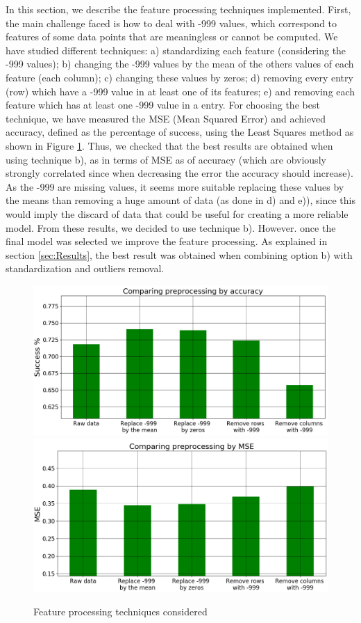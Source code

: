 \documentclass[10pt,conference,compsocconf]{IEEEtran}
\begin{document}
In this section, we describe the feature processing techniques implemented. First, the main challenge faced is how to deal with -999 values, which correspond to features of some data points that are meaningless or cannot be computed. We have studied different techniques: a) standardizing each feature (considering the -999 values); b) changing the -999 values by the mean of the others values of each feature (each column); c) changing these values by zeros; d) removing every entry (row) which have a -999 value in at least one of its features; e) and removing each feature which has at least one -999 value in a entry.
For choosing the best technique, we have measured the MSE (Mean Squared Error) and achieved accuracy, defined as the percentage of success, using the Least Squares method as shown in Figure \ref{fig:Data Preprocessing}. Thus, we checked that the best results are obtained when using technique b), as in terms of MSE as of accuracy (which are obviously strongly correlated since when decreasing the error the accuracy should increase). As the -999 are missing values, it seems more suitable replacing these values by the means than removing a huge amount of data (as done in d) and e)), since this would imply the discard of data that could be useful for creating a more reliable model.
From these results, we decided to use technique b). However. once the final model was selected we improve the feature processing. As explained in section \ref{sec:Results}, the best result was obtained when combining option b) with standardization and outliers removal.
\begin{figure}
  \centering
    \includegraphics[scale=0.26]{Preprocessing_bar_plot}
    \includegraphics[scale=0.27]{Preprocessing_bar_plot_mse.png}
  \caption[b]{\protect\label{fig:Data Preprocessing}Feature processing techniques considered}
  \setlength{\belowcaptionskip}{-1pt}
\end{figure}
\end{document}
